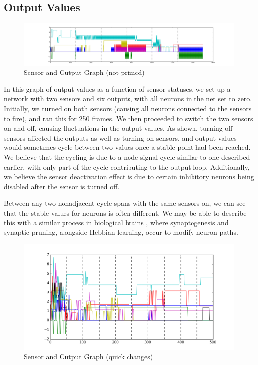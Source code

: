 \documentclass[12pt]{article}
\begin{document}
\subsection{Output Values}

\begin{figure}[H]
    \includegraphics[width=\linewidth]{../visualizations/8knodes_unrandomized.png}
    \caption{Sensor and Output Graph (not primed)}
    \label{fig:unprimed_sensoroutput_graph}
\end{figure}

In this graph of output values as a function of sensor statuses, we set up a network with two sensors and six outputs, with all neurons in the net set to zero.  Initially, we turned on both sensors (causing all neurons connected to the sensors to fire), and ran this for 250 frames.  We then proceeded to switch the two sensors on and off, causing fluctuations in the output values.  As shown, turning off sensors affected the outputs as well as turning on sensors, and output values would sometimes cycle between two values once a stable point had been reached.  We believe that the cycling is due to a node signal cycle similar to one described earlier, with only part of the cycle contributing to the output loop.  Additionally, we believe the sensor deactivation effect is due to certain inhibitory neurons being disabled after the sensor is turned off.

Between any two nonadjacent cycle spans with the same sensors on, we can see that the stable values for neurons is often different.  We may be able to describe this with a similar process in biological brains \cite{synapticlearning,synapticpruning}, where synaptogenesis and synaptic pruning, alongside Hebbian learning, occur to modify neuron paths. 

\begin{figure}[H]
    \centering
    \includegraphics[width=\linewidth]{../visualizations/8knodes_quick_changes.png}
    \caption{Sensor and Output Graph (quick changes)}
\end{figure}
\end{document}
